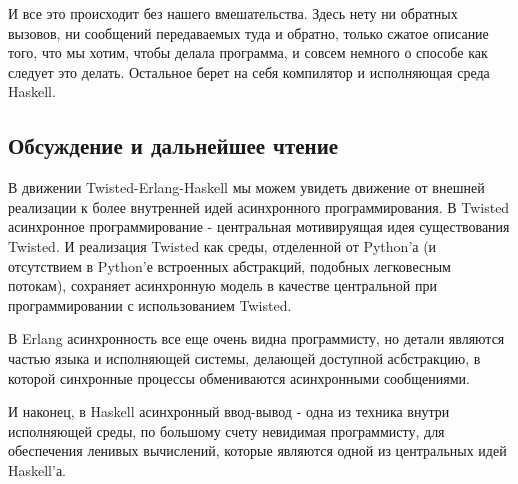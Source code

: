 И все это происходит без нашего вмешательства. 
Здесь нету ни обратных вызовов, ни сообщений передаваемых 
туда и обратно, только сжатое описание того, что мы 
хотим, чтобы делала программа, и совсем немного о способе 
как следует это делать. Остальное берет на себя компилятор и 
исполняющая среда Haskell.


\subsection{Обсуждение и дальнейшее чтение}

В движении Twisted-Erlang-Haskell мы можем увидеть движение
от внешней реализации к более внутренней 
идей асинхронного программирования. В Twisted асинхронное программирование - 
центральная мотивируящая идея существования Twisted. И 
реализация Twisted как среды, отделенной от Python'а (и отсутствием 
в Python'е встроенных абстракций, подобных легковесным потокам), 
сохраняет асинхронную модель в качестве центральной при 
программировании с использованием Twisted. 


В Erlang асинхронность все еще очень видна 
программисту, но детали являются частью 
языка и исполняющей системы, делающей доступной 
асбстракцию, в которой синхронные процессы 
обмениваются асинхронными сообщениями.  


И наконец, в Haskell асинхронный ввод-вывод - одна из техника 
внутри исполняющей среды, по большому счету невидимая программисту, 
для обеспечения ленивых вычислений, которые являются одной  
из центральных идей Haskell'а.


